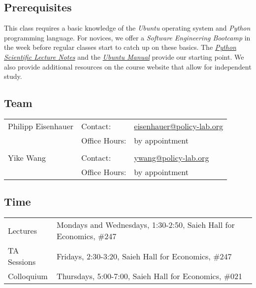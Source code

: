 \subsection*{Prerequisites}\vspace{0.5cm}
This class requires a basic knowledge of the  \textit{Ubuntu} operating system and  \textit{Python} programming language. For novices, we offer a \textit{Software Engineering Bootcamp} in the week before regular classes start to catch up on these basics. The \href{https://scipy-lectures.github.io/}{\textit{Python Scientific Lecture Notes}} and the \href{http://ubuntu-manual.org}{\textit{Ubuntu Manual}} provide our starting point. We also provide additional resources on the course website that allow for independent study.
\subsection*{Team}\vspace{0.5cm}
\begin{tabular}{l@{\qquad}ll}
Philipp Eisenhauer & Contact: & \href{mailto:eisenhauer@policy-lab.org}{eisenhauer@policy-lab.org} \\ 
&  Office Hours: & by appointment\\
&&\\
Yike Wang & Contact: & \href{mailto:ywang@policy-lab.org}{ywang@policy-lab.org}   \\ 
&  Office Hours: & by appointment
\end{tabular}\vspace{1cm}

\subsection*{Time}\vspace{0.5cm}
\begin{tabular}{l@{\qquad\qquad}l}
Lectures	&  Mondays and Wednesdays, 1:30-2:50, Saieh Hall for Economics, \#247 \\
TA Sessions	&  Fridays, 2:30-3:20, Saieh Hall for Economics, \#247  \\
Colloquium & Thursdays, 5:00-7:00, Saieh Hall for Economics, \#021 
\end{tabular}\vspace{1.0cm}
